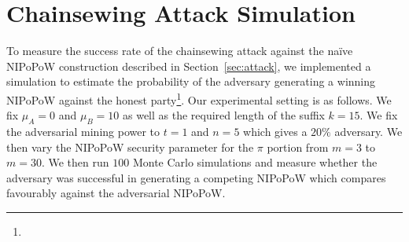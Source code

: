 \section{Chainsewing Attack Simulation}
\label{sec:simulation}

To measure the success rate of the chainsewing attack against the na\"ive NIPoPoW construction described in Section~\ref{sec:attack}, we implemented a simulation to estimate the probability of the adversary generating a winning NIPoPoW against the honest party\footnote{\fi}. Our experimental setting is as follows. We fix $\mu_A = 0$ and $\mu_B = 10$ as well as the required length of the suffix $k = 15$. We fix the adversarial mining power to $t = 1$ and $n = 5$ which gives a $20\%$ adversary. We then vary the NIPoPoW security parameter for the $\pi$ portion from $m = 3$ to $m = 30$. We then run $100$ Monte Carlo simulations and measure whether the adversary was successful in generating a competing NIPoPoW which compares favourably against the adversarial NIPoPoW.

